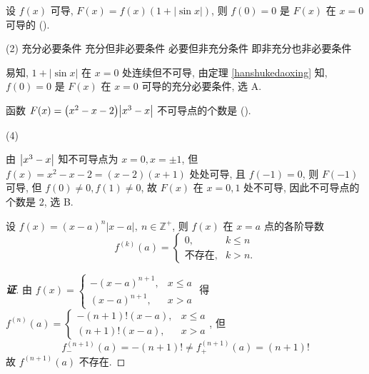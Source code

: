 \begin{example}[1995 数一]
    设 $f(x)$ 可导, $F(x)=f(x)(1+|\sin x|)$, 则 $f(0)=0$ 是 $F(x)$ 在 $x=0$ 可导的 (\quad).
    \begin{tasks}(2)
        \task 充分必要条件
        \task 充分但非必要条件
        \task 必要但非充分条件
        \task 即非充分也非必要条件
    \end{tasks}
\end{example}
\begin{solution}
    易知, $1+|\sin x|$ 在 $x=0$ 处连续但不可导, 由定理 \ref{hanshukedaoxing} 知, $f(0)=0$ 是 $F(x)$ 在 $x=0$ 可导的充分必要条件, 选 A.
\end{solution}

\begin{example}[1998 数二]
    函数 $ F(x)=\qty(x^2-x-2)\qty|x^3-x| $ 不可导点的个数是 (\quad).
    \begin{tasks}(4)
    \end{tasks}
\end{example}
\begin{solution}
    由 $\qty|x^3-x|$ 知不可导点为 $x=0,x=\pm1$, 但 $f(x)=x^2-x-2=(x - 2) (x + 1)$ 处处可导, 且 $f(-1)=0$, 则 $F(-1)$ 可导, 
    但 $f(0)\neq 0,f(1)\neq 0$, 故 $F(x)$ 在 $x=0,1$ 处不可导, 因此不可导点的个数是 2, 选 B.
\end{solution}



\begin{theorem}
    设 $f(x)=(x-a)^{n}|x-a|,~n\in\mathbb{Z}^{+}$, 则 $f(x)$ 在 $x=a$ 点的各阶导数 $$f^{(k)}(a)=\begin{cases}
        0,&k\leqslant n\\\text{不存在},&k>n.
    \end{cases}$$
\end{theorem}
\begin{proof}[{\songti \textbf{证}}]
    由 $f(x)=\begin{cases}
        -(x-a)^{n+1},&x\leqslant a\\(x-a)^{n+1},&x>a
    \end{cases}$ 得 $f^{(n)}(a)=\begin{cases}
        -(n+1)!(x-a),&x\leqslant a\\ (n+1)!(x-a),&x>a
    \end{cases}$, 但 $$f^{(n+1)}_-(a)=-(n+1)!\neq f^{(n+1)}_+(a)=(n+1)!$$ 故 $f^{(n+1)}(a)$ 不存在.
\end{proof}

